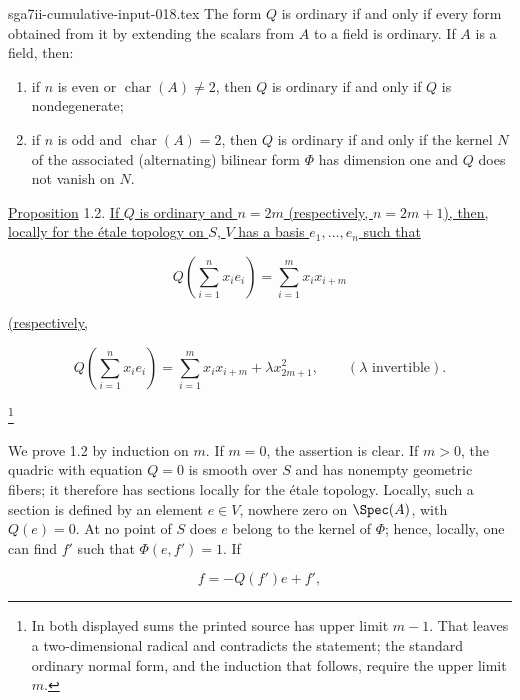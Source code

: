 \begin{filecontents*}{sga7ii-cumulative-input-018.tex}
The form $Q$ is ordinary if and only if every form obtained from it by
extending the scalars from $A$ to a field is ordinary.  If $A$ is a
field, then:

\begin{enumerate}[label=\alph*),leftmargin=2.5em]
\item if $n$ is even or $\operatorname{char}(A)\ne2$, then $Q$ is ordinary
if and only if $Q$ is nondegenerate;

\item if $n$ is odd and $\operatorname{char}(A)=2$, then $Q$ is ordinary
if and only if the kernel $N$ of the associated (alternating) bilinear
form $\Phi$ has dimension one and $Q$ does not vanish on $N$.
\end{enumerate}

\underline{Proposition} 1.2. \underline{If $Q$ is ordinary and
$n=2m$ (respectively, $n=2m+1$), then, locally for the étale topology on
$S$, $V$ has a basis $e_1,\ldots,e_n$ such that}


\begin{equation*}
Q\!\left(\sum_{i=1}^{n}x_i e_i\right)
=\sum_{i=1}^{m}x_i x_{i+m}
\end{equation*}

\noindent\underline{(respectively,}

\begin{equation*}
Q\!\left(\sum_{i=1}^{n}x_i e_i\right)
=\sum_{i=1}^{m}x_i x_{i+m}+\lambda x_{2m+1}^{2},
\qquad (\lambda\text{ invertible}).
\end{equation*}

\footnote{In both displayed sums the printed source has upper limit
$m-1$.  That leaves a two-dimensional radical and contradicts the
statement; the standard ordinary normal form, and the induction that
follows, require the upper limit $m$.}

We prove 1.2 by induction on $m$.  If $m=0$, the assertion is clear.  If
$m>0$, the quadric with equation $Q=0$ is smooth over $S$ and has
nonempty geometric fibers; it therefore has sections locally for the
étale topology.  Locally, such a section is defined by an element
$e\in V$, nowhere zero on $\Spec(A)$, with $Q(e)=0$.  At no point of $S$
does $e$ belong to the kernel of $\Phi$; hence, locally, one can find
$f'$ such that $\Phi(e,f')=1$.  If

\begin{equation*}
f=-Q(f')e+f',
\end{equation*}


\end{filecontents*}
